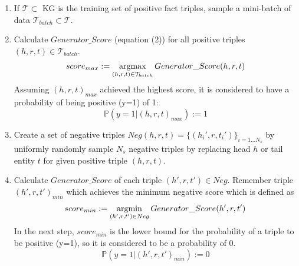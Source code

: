 \begin{enumerate}
    \item 
    If $\mathcal{T} \subset $ \ac{KG} is the training set of positive fact triples, sample a mini-batch of data $\mathcal{T}_{batch} \subset \mathcal{T}$.
 
    \item  Calculate $Generator\_Score$ (equation (2)) for all positive triples $(h, r, t) \in \mathcal{T}_{batch}$.
    \begin{equation}
        score_{max} := \operatorname*{argmax}_{(h,r,t) \in \mathcal{T}_{batch}}{Generator\_Score(h,r,t)}
    \end{equation}
    Assuming $(h,r,t)_{max}$ achieved the highest score, 
    it is considered to have a probability of being positive (y=1) of 1:
    \begin{equation}
        \mathds{P}(y = 1|(h, r, t)_{max}) := 1
    \end{equation}
    
    \item 
    Create a set of negative triples $Neg(h,r,t)=\{(h_i',r,t_i')\}_{i=1\dots N_s}$ by uniformly randomly sample $N_s$ negative triples by replacing head $h$ or tail entity $t$ for given positive triple $(h, r, t)$.
    
    \item 
    Calculate $Generator\_Score$ of each triple $(h',r,t') \in Neg$.
    Remember triple $(h',r,t')_{min}$ which achieves the minimum negative score which is defined as
    \begin{equation}
        score_{min} := \operatorname*{argmin}_{(h', r, t') \in Neg}{Generator\_Score(h', r, t')}
    \end{equation}
    In the next step, $score_{min}$ is the lower bound for the probability of a triple to be positive (y=1), so it is considered to be a probability of 0.
    \begin{equation}
        \mathds{P}(y = 1|(h', r, t')_{min}) := 0
    \end{equation}
    

\end{enumerate}
